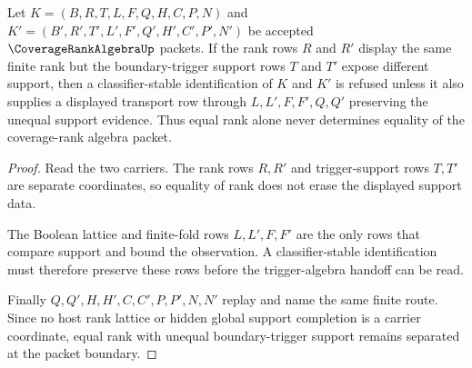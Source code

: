 \begin{theorem}
\label{thm:coverage-rank-algebra-boundary-trigger-separation}
Let $K=(B,R,T,L,F,Q,H,C,P,N)$ and $K'=(B',R',T',L',F',Q',H',C',P',N')$ be accepted $\CoverageRankAlgebraUp$ packets. If the rank rows $R$ and $R'$ display the same finite rank but the boundary-trigger support rows $T$ and $T'$ expose different support, then a classifier-stable identification of $K$ and $K'$ is refused unless it also supplies a displayed transport row through $L,L',F,F',Q,Q'$ preserving the unequal support evidence. Thus equal rank alone never determines equality of the coverage-rank algebra packet.
\end{theorem}
\begin{proof}
Read the two carriers. The rank rows $R,R'$ and trigger-support rows $T,T'$ are separate coordinates, so equality of rank does not erase the displayed support data.

The Boolean lattice and finite-fold rows $L,L',F,F'$ are the only rows that compare support and bound the observation. A classifier-stable identification must therefore preserve these rows before the trigger-algebra handoff can be read.

Finally $Q,Q',H,H',C,C',P,P',N,N'$ replay and name the same finite route. Since no host rank lattice or hidden global support completion is a carrier coordinate, equal rank with unequal boundary-trigger support remains separated at the packet boundary.
\end{proof}




